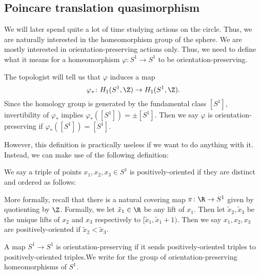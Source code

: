 \documentclass[a4paper]{article}
\newcommand\Homeo{\mathrm{Homeo}}
\begin{document}
\subsection{Poincare translation quasimorphism}
We will later spend quite a lot of time studying actions on the circle. Thus, we are naturally interested in the homeomorphism group of the sphere. We are mostly interested in orientation-preserving actions only. Thus, we need to define what it means for a homeomorphism $\varphi\colon S^1 \to S^1$ to be orientation-preserving.

The topologist will tell us that $\varphi$ induces a map
\[
  \varphi_*\colon H_1(S^1, \Z) \to H_1(S^1, \Z).
\]
Since the homology group is generated by the fundamental class $[S^1]$, invertibility of $\varphi_*$ implies $\varphi_*([S^1]) = \pm [S^1]$. Then we say $\varphi$ is orientation-preserving if $\varphi_*([S^1]) = [S^1]$.

However, this definition is practically useless if we want to do anything with it. Instead, we can make use of the following definition:

\begin{defi}
  We say a triple of points $x_1, x_2, x_3 \in S^1$ is positively-oriented if they are distinct and ordered as follows:
  \begin{center}
  \end{center}
  More formally, recall that there is a natural covering map $\pi\colon \R \to S^1$ given by quotienting by $\Z$.  Formally, we let $\tilde{x}_1 \in \R$ be any lift of $x_1$. Then let $\tilde{x}_2, \tilde{x}_3$ be the unique lifts of $x_2$ and $x_3$ respectively to $[\tilde{x}_1, \tilde{x}_1 + 1)$. Then we say $x_1, x_2, x_3$ are positively-oriented if $\tilde{x}_2 < \tilde{x}_3$.
\end{defi}

\begin{defi}
  A map $S^1 \to S^1$ is orientation-preserving if it sends positively-oriented triples to positively-oriented triples.We write \term{$\Homeo^+(S^1)$} for the group of orientation-preserving homeomorphisms of $S^1$.
\end{defi}
\end{document}
